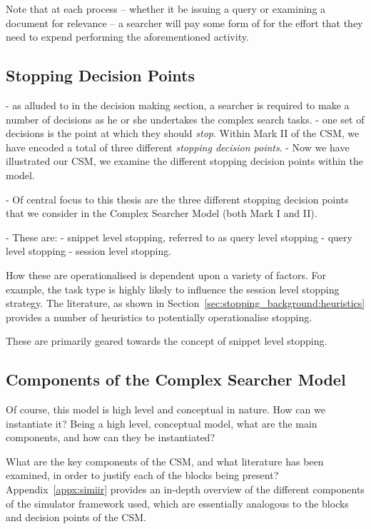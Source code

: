 Note that at each process -- whether it be issuing a query or examining a document for relevance -- a searcher will pay some form of  for the effort that they need to expend performing the aforementioned activity.

\subsection{Stopping Decision Points}\label{sec:proposal:model:stopping_points}
- as alluded to in the decision making section, a searcher is required to make a number of decisions as he or she undertakes the complex search tasks.
- one set of decisions is the point at which they should \emph{stop}. Within Mark II of the CSM, we have encoded a total of three different \emph{stopping decision points}.
- Now we have illustrated our CSM, we examine the different stopping decision points within the model.

- Of central focus to this thesis are the three different stopping decision points that we consider in the Complex Searcher Model (both Mark I and II).

- These are:
    - snippet level stopping, referred to as query level stopping
    - query level stopping
    - session level stopping.

How these are operationalised is dependent upon a variety of factors. For example, the task type is highly likely to influence the session level stopping strategy. The literature, as shown in Section~\ref{sec:stopping_background:heuristics} provides a number of heuristics to potentially operationalise stopping.

These are primarily geared towards the concept of snippet level stopping.



\subsection{Components of the Complex Searcher Model}
Of course, this model is high level and conceptual in nature. How can we instantiate it?
Being a high level, conceptual model, what are the main components, and how can they be instantiated?

What are the key components of the CSM, and what literature has been examined, in order to justify each of the blocks being present? Appendix~\ref{appx:simiir} provides an in-depth overview of the different components of the simulator framework used, which are essentially analogous to the blocks and decision points of the CSM.

